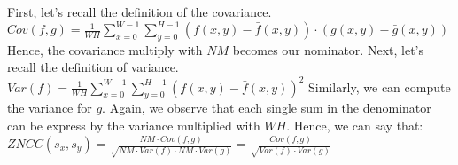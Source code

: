 \documentclass{article}
\begin{document}
\newline\newline
First, let's recall the definition of the covariance.
\newline\newline
$Cov(f,g) = \frac{1}{WH} \sum_{x=0}^{W-1} \sum_{y=0}^{H-1} (f(x,y) - \bar{f}(x,y)) \cdot (g(x,y) - \bar{g}(x,y))$
\newline\newline
Hence, the covariance multiply with $NM$ becomes our nominator.
\newline\newline\newline
Next, let's recall the definition of variance. 
\newline\newline
$Var(f) = \frac{1}{WH} \sum_{x=0}^{W-1} \sum_{y=0}^{H-1} (f(x,y) - \bar{f}(x,y))^2$
\newline\newline
Similarly, we can compute the variance for $g$. Again, we observe that each single sum in the denominator can be express by the variance multiplied with $WH$. \newline Hence, we can say that:
\newline\newline
$ZNCC(s_x, s_y) = \frac{NM \cdot Cov(f,g)}{\sqrt{NM \cdot Var(f) \cdot NM \cdot Var(g)}}
= \frac{Cov(f,g)}{\sqrt{Var(f) \cdot Var(g)}}$
\end{document}

